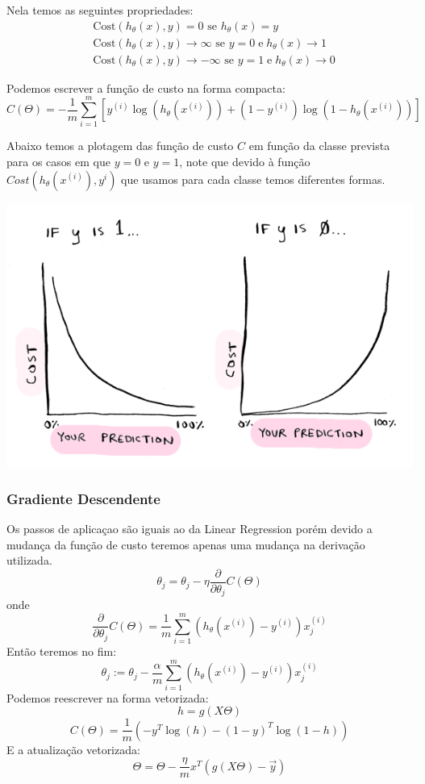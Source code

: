 \documentclass[11pt,a4paper,leqno]{article}
\begin{document}
Nela temos as seguintes propriedades:
\begin{align*}
	& \mathrm{Cost}(h_\theta(x),y) = 0 \text{ se } h_\theta(x) = y \\
	& \mathrm{Cost}(h_\theta(x),y) \rightarrow \infty \text{ se } y = 0 \; \mathrm{e} \; h_\theta(x) \rightarrow 1 \\
	& \mathrm{Cost}(h_\theta(x),y) \rightarrow -\infty \text{ se } y = 1 \; \mathrm{e} \; h_\theta(x) \rightarrow 0
\end{align*}

Podemos escrever a função de custo na forma compacta:
\[
C(\Theta) = - \frac{1}{m} \displaystyle \sum_{i=1}^m [y^{(i)} \log(h_\theta(x^{(i)})) + (1 - y^{(i)}) \log(1 - h_\theta(x^{(i)}))]
\]

Abaixo temos a plotagem das função de custo $C$ em função da classe prevista para os casos em que $y = 0$ e $y = 1$, note que devido à função $Cost(h_\theta(x^{(i)}), y^{i})$ que usamos para cada classe temos diferentes formas.

\includegraphics[scale=0.5]{Images/logistic_regression_plot_cost_function.png} 


\subsubsection{Gradiente Descendente}
Os passos de aplicaçao são iguais ao da Linear Regression porém devido a mudança da função de custo teremos apenas uma mudança na derivação utilizada.
\[
\theta_j = \theta_j - \eta \frac{\partial}{\partial \theta_j} C(\Theta)
\]
onde
\[
\frac{\partial}{\partial \theta_j} C(\Theta) = \frac{1}{m} \sum_{i=1}^m (h_\theta(x^{(i)}) - y^{(i)}) x_j^{(i)}
\]
Então teremos no fim:
\[
\theta_j := \theta_j - \frac{\alpha}{m} \sum_{i=1}^m (h_\theta(x^{(i)}) - y^{(i)}) x_j^{(i)}
\]
Podemos reescrever na forma vetorizada:
\[ h = g(X \Theta) \]
\[
C(\Theta) = \frac{1}{m} (-y^T \log(h) - (1 - y)^T \log(1 - h))
\]
E a atualização vetorizada:
\[
\Theta = \Theta - \frac{\eta}{m} x^T (g(X\Theta) - \vec{y})
\]
	
\end{document}

